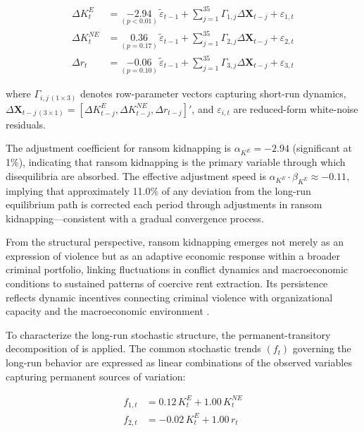 \documentclass[12pt,a4paper]{article}
\providecommand{\textcite}{\citet}
\providecommand{\parencite}{\citep}
\theoremstyle{plain}
\theoremstyle{definition}
\theoremstyle{remark}
\newcommand{\1}{\mathbf{1}}
\begin{document}
\begin{align}
  \Delta K^{E}_t &= \underset{(p < 0.01)}{-2.94}\,\tilde{\varepsilon}_{t-1}
    + \sum_{j=1}^{35}\Gamma_{1,j}\Delta\mathbf{X}_{t-j} + \varepsilon_{1,t}
  \label{eq_3}\\
  \Delta K^{NE}_t &= \underset{(p = 0.17)}{0.36}\,\tilde{\varepsilon}_{t-1}
    + \sum_{j=1}^{35}\Gamma_{2,j}\Delta\mathbf{X}_{t-j} + \varepsilon_{2,t}
  \label{eq_4}\\
  \Delta r_t &= \underset{(p = 0.10)}{-0.06}\,\tilde{\varepsilon}_{t-1}
    + \sum_{j=1}^{35}\Gamma_{3,j}\Delta\mathbf{X}_{t-j} + \varepsilon_{3,t}
  \label{eq_5}
\end{align}

where $\Gamma_{i,j\,(1\times3)}$ denotes row-parameter vectors capturing short-run
dynamics, $\Delta\mathbf{X}_{t-j\,(3\times1)}=[\Delta K^E_{t-j},\Delta K^{NE}_{t-j},
\Delta r_{t-j}]'$, and $\varepsilon_{i,t}$ are reduced-form white-noise residuals.

The adjustment coefficient for ransom kidnapping is $\alpha_{K^E}=-2.94$ (significant
at 1\%), indicating that ransom kidnapping is the primary variable through which
disequilibria are absorbed. The effective adjustment speed is
$\alpha_{K^E}\cdot\beta_{K^E}\approx-0.11$, implying that approximately 11.0\% of
any deviation from the long-run equilibrium path is corrected each period through
adjustments in ransom kidnapping---consistent with a gradual convergence process.

From the structural perspective, ransom kidnapping emerges not merely as an expression
of violence but as an adaptive economic response within a broader criminal portfolio,
linking fluctuations in conflict dynamics and macroeconomic conditions to sustained
patterns of coercive rent extraction. Its persistence reflects dynamic incentives
connecting criminal violence with organizational capacity and the macroeconomic
environment \parencite{Becker1968,Ehrlich1973,LevittMiles2006}.

To characterize the long-run stochastic structure, the permanent-transitory
decomposition of \textcite{GonzaloGranger1995} is applied. The common stochastic
trends $(f_t)$ governing the long-run behavior are expressed as linear combinations
of the observed variables capturing permanent sources of variation:

\begin{align}
  f_{1,t} &= 0.12\,K^{E}_t + 1.00\,K^{NE}_t
  \label{eq_6}\\
  f_{2,t} &= -0.02\,K^{E}_t + 1.00\,r_t
  \label{eq_7}
\end{align}
\end{document}
